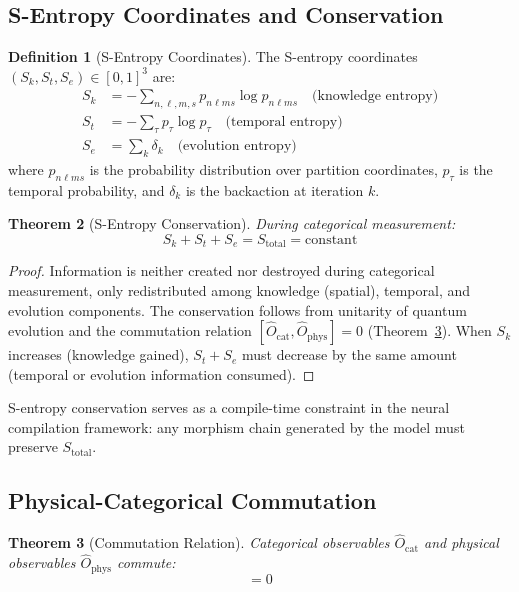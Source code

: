 \documentclass[11pt,a4paper]{article}
\newtheorem{theorem}{Theorem}[section]
\theoremstyle{definition}
\newtheorem{definition}[theorem]{Definition}
\theoremstyle{remark}
\newcommand{\Sk}{S_k}
\newcommand{\St}{S_t}
\newcommand{\Se}{S_e}
\begin{document}
\subsection{S-Entropy Coordinates and Conservation}

\begin{definition}[S-Entropy Coordinates]
\label{def:s_entropy}
The S-entropy coordinates $(\Sk, \St, \Se) \in [0,1]^3$ are:
\begin{align}
\Sk &= -\sum_{n,\ell,m,s} p_{n\ell ms} \log p_{n\ell ms} \quad \text{(knowledge entropy)} \\
\St &= -\sum_{\tau} p_{\tau} \log p_{\tau} \quad \text{(temporal entropy)} \\
\Se &= \sum_k \delta_k \quad \text{(evolution entropy)}
\end{align}
where $p_{n\ell ms}$ is the probability distribution over partition coordinates, $p_\tau$ is the temporal probability, and $\delta_k$ is the backaction at iteration $k$.
\end{definition}

\begin{theorem}[S-Entropy Conservation]
\label{thm:conservation}
During categorical measurement:
\begin{equation}
\Sk + \St + \Se = S_{\mathrm{total}} = \mathrm{constant}
\end{equation}
\end{theorem}

\begin{proof}
Information is neither created nor destroyed during categorical measurement, only redistributed among knowledge (spatial), temporal, and evolution components. The conservation follows from unitarity of quantum evolution and the commutation relation $[\hat{O}_{\mathrm{cat}}, \hat{O}_{\mathrm{phys}}] = 0$ (Theorem~\ref{thm:commutation}). When $\Sk$ increases (knowledge gained), $\St + \Se$ must decrease by the same amount (temporal or evolution information consumed).
\end{proof}

S-entropy conservation serves as a compile-time constraint in the neural compilation framework: any morphism chain generated by the model must preserve $S_{\mathrm{total}}$.

\subsection{Physical-Categorical Commutation}

\begin{theorem}[Commutation Relation]
\label{thm:commutation}
Categorical observables $\hat{O}_{\mathrm{cat}}$ and physical observables $\hat{O}_{\mathrm{phys}}$ commute:
\begin{equation}
[\hat{O}_{\mathrm{cat}}, \hat{O}_{\mathrm{phys}}] = 0
\end{equation}
\end{theorem}
\end{document}
